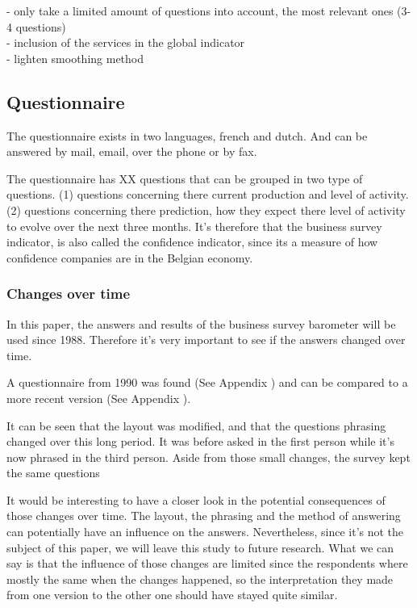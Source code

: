 \documentclass[12pt,a4paper,oneside]{book}
\begin{document}
- only take a limited amount of questions into account, the most relevant ones (3-4 questions) \\
- inclusion of the services in the global indicator \\
- lighten smoothing method




\subsection{Questionnaire}
\label{sec:Questionnaire}

The questionnaire exists in two languages, french and dutch. And can be answered by mail, email, over the phone or by fax.

The questionnaire has XX questions that can be grouped in two type of questions. 
(1) questions concerning there current production and level of activity.
(2) questions concerning there prediction, how they expect there level of activity to evolve over the next three months.
It's therefore that the business survey indicator, is also called the confidence indicator, since its a measure of how confidence companies are in the Belgian economy.


\subsubsection{Changes over time}

In this paper, the answers and results of the business survey barometer will be used since 1988. Therefore it's very important to see if the answers changed over time.

A questionnaire from 1990 was found (See Appendix ) and can be compared to a more recent version (See Appendix ).

It can be seen that the layout was modified, and that the questions phrasing changed over this long period. It was before asked in the first person while it's now phrased in the third person. Aside from those small changes, the survey kept the same questions

It would be interesting to have a closer look in the potential consequences of those changes over time. The layout, the phrasing and the method of answering can potentially have an influence on the answers. Nevertheless, since it's not the subject of this paper, we will leave this study to future research.
What we  can say is that the influence of those changes are limited since the respondents where mostly the same when the changes happened, so the interpretation they made from 
one version to the other one should have stayed quite similar.
\end{document}
